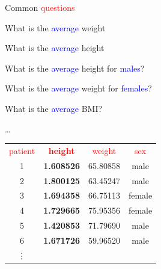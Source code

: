 \documentclass{presentatiesmetlogo}
\begin{document}
\bitem
\item {}
\newline\newline
\item Common \textcolor{red}{questions}
\newline
\bitemt
\item What is the \textcolor{blue}{average} weight
\item What is the \textcolor{blue}{average} height
\item What is the \textcolor{blue}{average} height for \textcolor{blue}{males}?
\item What is the \textcolor{blue}{average} weight for \textcolor{blue}{females}?\
\item What is the \textcolor{blue}{average} BMI?
\item \dots
\eitemt
\eitem

\begin{tabular}{cccc}
	\textcolor{red}{patient} &  \textbf{\textcolor{red}{height}} &  \textcolor{red}{weight}  &  \textcolor{red}{sex} \\
	1& \textbf{1.608526}& 65.80858&   male \\
	2& \textbf{1.800125}& 63.45247&   male \\
	3& \textbf{1.694358}& 66.75113& female \\
	4& \textbf{1.729665}& 75.95356& female \\
	5& \textbf{1.420853}& 71.79690&   male \\
	6& \textbf{1.671726}& 59.96520&   male \\
	\vdots &&&
\end{tabular}
\end{document}
